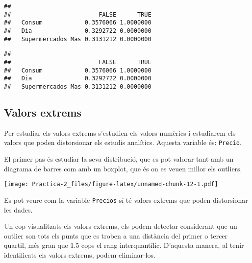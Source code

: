 \documentclass[
]{article}
\newenvironment{Shaded}{\begin{snugshade}}{\end{snugshade}}
\newcommand{\AttributeTok}[1]{\textcolor[rgb]{0.13,0.29,0.53}{#1}}
\newcommand{\CommentTok}[1]{\textcolor[rgb]{0.56,0.35,0.01}{\textit{#1}}}
\newcommand{\DecValTok}[1]{\textcolor[rgb]{0.00,0.00,0.81}{#1}}
\newcommand{\FunctionTok}[1]{\textcolor[rgb]{0.13,0.29,0.53}{\textbf{#1}}}
\newcommand{\NormalTok}[1]{#1}
\newcommand{\SpecialCharTok}[1]{\textcolor[rgb]{0.81,0.36,0.00}{\textbf{#1}}}
\begin{document}
\begin{verbatim}
##                    
##                         FALSE      TRUE
##   Consum            0.3576066 1.0000000
##   Dia               0.3292722 0.0000000
##   Supermercados Mas 0.3131212 0.0000000
\end{verbatim}

\begin{Shaded}
\end{Shaded}

\begin{verbatim}
##                    
##                         FALSE      TRUE
##   Consum            0.3576066 1.0000000
##   Dia               0.3292722 0.0000000
##   Supermercados Mas 0.3131212 0.0000000
\end{verbatim}

\hypertarget{valors-extrems}{%
\subsection{Valors extrems}\label{valors-extrems}}

Per estudiar els valors extrems s'estudien els valors numèrics i
estudiarem els valors que poden distorsionar els estudis analítics.
Aquesta variable és: \texttt{Precio}.

El primer pas és estudiar la seva distribució, que es pot valorar tant
amb un diagrama de barres com amb un boxplot, que és on es veuen millor
els outliers.

\texttt{[image: Practica-2\_files/figure-latex/unnamed-chunk-12-1.pdf]}

Es pot veure com la variable \texttt{Precios} sí té valors extrems que
poden distorsionar les dades.

Un cop visualitzats els valors extrems, els podem detectar considerant
que un outlier son tots els punts que es troben a una distància del
primer o tercer quartil, més gran que 1.5 cops el rang interquantílic.
D'aquesta manera, al tenir identificats els valors extrems, podem
eliminar-los.
\end{document}
